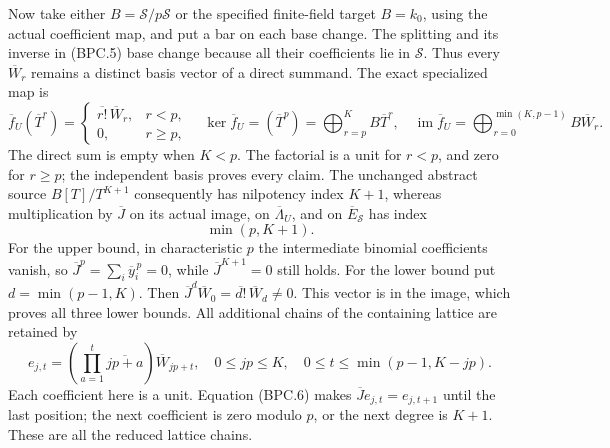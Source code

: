 Now take either \(B=\mathscr S/p\mathscr S\) or the specified finite-field target
\(B=k_0\), using the actual coefficient map, and put a bar on
each base change.  The splitting and its inverse in (BPC.5)
base change because all their coefficients lie in \(\mathscr S\).
Thus every \(\overline W_r\) remains a distinct basis vector
of a direct summand.  The exact specialized map is
\[
 \overline f_U(\overline T^r)=
 \begin{cases}\overline{r!}\,\overline W_r,&r<p,\\
 0,&r\geq p,
 \end{cases}
 \quad
 \ker\overline f_U=(\overline T^p)
       =\bigoplus_{r=p}^K B\overline T^r,
 \quad
 \operatorname{im}\overline f_U
       =\bigoplus_{r=0}^{\min(K,p-1)}B\overline W_r.
\tag{BPC.11}\label{eq:bpc11}
\]
The direct sum is empty when \(K<p\).  The factorial is a
unit for \(r<p\), and zero for \(r\geq p\); the independent
basis proves every claim.  The unchanged abstract source
\(B[T]/T^{K+1}\) consequently has nilpotency index \(K+1\),
whereas multiplication by \(\overline J\) on its actual
image, on \(\overline\Lambda_U\), and on \(\overline E_{\mathscr S}\)
has index
\[
                         \min(p,K+1).
\tag{BPC.12}\label{eq:bpc12}
\]
For the upper bound, in characteristic \(p\) the intermediate
binomial coefficients vanish, so
\(\overline J^p=\sum_i\overline y_i^{\,p}=0\), while
\(\overline J^{K+1}=0\) still holds.  For the lower bound put
\(d=\min(p-1,K)\).  Then
\(\overline J^d\overline W_0=\overline{d!}\,\overline W_d\ne0\).
This vector is in the image, which proves all three lower
bounds.  All additional chains of the containing lattice are
retained by
\[
 e_{j,t}=\left(\prod_{a=1}^t\overline{jp+a}\right)
           \overline W_{jp+t},
 \quad 0\leq jp\leq K,\quad
 0\leq t\leq\min(p-1,K-jp).
\tag{BPC.13}\label{eq:bpc13}
\]
Each coefficient here is a unit.  Equation (BPC.6) makes
\(\overline Je_{j,t}=e_{j,t+1}\) until the last position;
the next coefficient is zero modulo \(p\), or the next
degree is \(K+1\).  These are all the reduced lattice chains.

